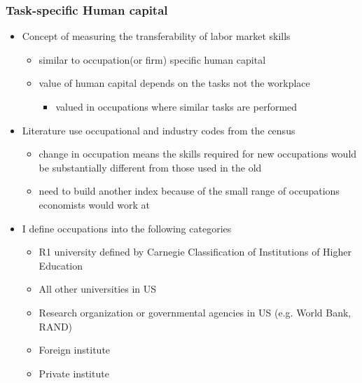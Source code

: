 \documentclass[11pt]{beamer}
\begin{document}
\begin{frame}
	\frametitle{Task-specific Human capital}
	\begin{itemize}
		\item Concept of measuring the transferability of labor market skills
		\begin{itemize}
			\item similar to occupation(or firm) specific human capital
			\item value of human capital depends on the tasks not the workplace
			\begin{itemize}
				\item valued  in occupations where similar tasks are performed
			\end{itemize}
		
		\end{itemize}
		\vspace{1 mm}
	\item Literature use occupational and industry codes from the census
	\begin{itemize}
		\item change in occupation means the skills required for new occupations would be substantially different from those used in the old 
		\item need to build another index because of the small range of occupations economists would work at
	\end{itemize}
		\vspace{1 mm}
	\item I define occupations into the following categories
	\begin{itemize}
		\item R1 university defined by Carnegie Classification of Institutions of Higher Education
		\item All other universities in US
		\item Research organization or governmental agencies in US (e.g. World Bank, RAND)
		\item Foreign institute
		\item Private institute
	\end{itemize}
	\end{itemize}
\end{frame}
\end{document}
